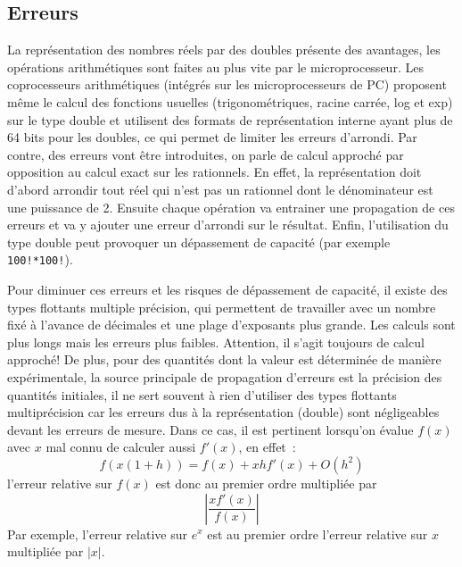 \documentclass[a4paper,11pt]{book}
\begin{document}
\begin{giacjshere}
\subsection{Erreurs} 
La repr\'esentation des nombres r\'eels par des doubles pr\'esente
des avantages, les op\'erations arithm\'etiques
sont faites au plus vite par le microprocesseur.
Les coprocesseurs arithmétiques (intégrés sur les microprocesseurs
de PC) proposent m\^eme
le calcul des fonctions usuelles (trigonométriques, racine carrée, log et exp)
sur le type double et utilisent des formats de représentation interne
ayant plus de 64 bits pour les doubles, ce qui permet de limiter
les erreurs d'arrondi. 
Par contre, des erreurs vont \^etre introduites,
on parle de calcul approch\'e par opposition au calcul exact sur les
rationnels. En effet, la repr\'esentation doit d'abord arrondir 
tout r\'eel qui n'est pas un rationnel dont le d\'enominateur
est une puissance de 2. Ensuite chaque op\'eration va entrainer
une propagation de ces erreurs et va y ajouter une erreur d'arrondi 
sur le r\'esultat.
Enfin, l'utilisation du type double peut provoquer un d\'epassement
de capacit\'e (par exemple \verb|100!*100!|).

Pour diminuer ces erreurs et les risques de d\'epassement de
capacit\'e, il existe des types flottants multiple pr\'ecision,
qui permettent de travailler avec un nombre fix\'e \`a l'avance
de d\'ecimales et une plage d'exposants plus grande. Les calculs sont plus longs mais les erreurs
plus faibles. Attention, il s'agit toujours de calcul approch\'e!
De plus, pour des quantit\'es dont la valeur est d\'etermin\'ee
de mani\`ere exp\'erimentale, la source principale de propagation
d'erreurs est la pr\'ecision des quantit\'es initiales, il ne sert
souvent \`a rien d'utiliser des types flottants multipr\'ecision car les
erreurs dus à la représentation (double) sont négligeables devant
les erreurs de mesure. Dans ce cas, il est pertinent lorsqu'on
\'evalue $f(x)$ avec $x$ mal connu de calculer aussi $f'(x)$, en effet~:
$$ f(x(1+h))= f(x)+xh f'(x) + O(h^2)$$
l'erreur relative sur $f(x)$ est donc au premier ordre multipli\'ee par
$$ |\frac{xf'(x)}{f(x)}|$$
Par exemple, l'erreur relative sur $e^x$ est au premier ordre l'erreur relative sur $x$
multipli\'ee par $|x|$.
\\


\end{giacjshere}
\end{document}
